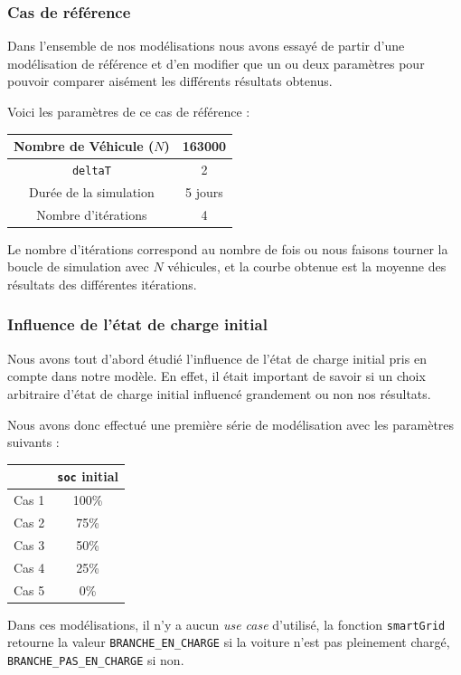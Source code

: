 			\subsubsection{Cas de référence}
			
			Dans l'ensemble de nos modélisations nous avons essayé de partir d'une modélisation de référence et d'en modifier que un ou deux paramètres pour pouvoir comparer aisément les différents résultats obtenus.
			
			Voici les paramètres de ce cas de référence :
			\begin{table}[h!]
			\centering
			\begin{tabular}{|c|c|}
			\hline
			Nombre de Véhicule ($N$) & 163000 \\
			\hline
			\lstinline|deltaT| & \SI{2}{\min} \\
			\hline
			Durée de la simulation & 5 jours \\
			\hline
			Nombre d'itérations & 4 \\
			\hline
			\end{tabular}
			\end{table}
			Le nombre d'itérations correspond au nombre de fois ou nous faisons tourner la boucle de simulation avec $N$ véhicules, et la courbe obtenue est la moyenne des résultats des différentes itérations.
			
			\subsubsection{Influence de l'état de charge initial}
				
				Nous avons tout d'abord étudié l'influence de l'état de charge initial pris en compte dans notre modèle. En effet, il était important de savoir si un choix arbitraire d'état de charge initial influencé grandement ou non nos résultats.
					
				Nous avons donc effectué une première série de modélisation avec les paramètres suivants :
				\begin{table}[h!]
				\centering
				
				\begin{tabular}{|c||c|}
					\hline
					& \lstinline|soc| initial\\
					\hline
					Cas 1 & 100\% \\
					\hline
					Cas 2 & 75\%\\
					\hline
					Cas 3 & 50\%\\
					\hline
					Cas 4 & 25\%\\
					\hline
					Cas 5 & 0\%\\
					\hline
				\end{tabular}
				\end{table}
				Dans ces modélisations, il n'y a aucun \emph{use case} d'utilisé, la fonction \lstinline|smartGrid| retourne la valeur \lstinline|BRANCHE_EN_CHARGE| si la voiture n'est pas pleinement chargé, \lstinline|BRANCHE_PAS_EN_CHARGE| si non.
				
